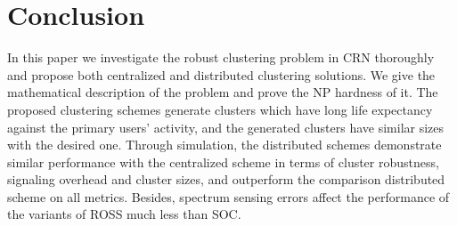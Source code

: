 \documentclass[times]{ettauth}
\theoremstyle{mytheoremstyle}
\theoremstyle{mytheoremstyle}
\theoremstyle{mytheoremstyle}
\begin{document}
\section{Conclusion}
\label{conclusion}
In this paper we investigate the robust clustering problem in CRN thoroughly and propose both centralized and distributed clustering solutions.
We give the mathematical description of the problem and prove the NP hardness of it.
The proposed clustering schemes generate clusters which have long life expectancy against the primary users' activity, and the generated clusters have similar sizes with the desired one.
Through simulation, the distributed schemes demonstrate similar performance with the centralized scheme in terms of cluster robustness, signaling overhead and cluster sizes, and outperform the comparison distributed scheme on all metrics.
Besides, spectrum sensing errors affect the performance of the variants of ROSS much less than SOC.










%
\end{document}
